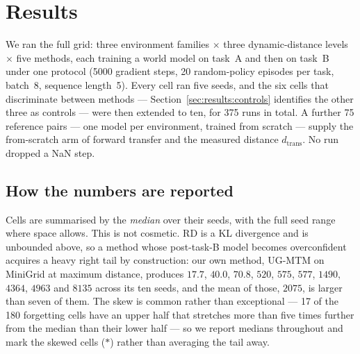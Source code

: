 %
%
%

\section{Results}
\label{sec:results}

We ran the full grid: three environment families $\times$ three dynamic-distance
levels $\times$ five methods, each training a world model on task~A and then on
task~B under one protocol (5000 gradient steps, 20 random-policy episodes per
task, batch~8, sequence length~5). Every cell ran five seeds, and the six cells
that discriminate between methods --- Section~\ref{sec:results:controls}
identifies the other three as controls --- were then extended to ten, for 375
runs in total. A further 75 reference pairs --- one model per environment,
trained from scratch --- supply the from-scratch arm of forward transfer and the
measured distance $d_{\mathrm{trans}}$. No run dropped a NaN step.

\subsection{How the numbers are reported}
\label{sec:results:reporting}

Cells are summarised by the \emph{median} over their seeds, with the full seed
range where space allows. This is not cosmetic. RD is a KL divergence and is
unbounded above, so a method whose post-task-B model becomes overconfident
acquires a heavy right tail by construction: our own method, UG-MTM on MiniGrid
at maximum distance, produces $17.7$, $40.0$, $70.8$, $520$, $575$, $577$,
$1490$, $4364$, $4963$ and $8135$ across its ten seeds, and the mean of those,
$2075$, is larger than seven of them. The skew is common rather than
exceptional --- 17 of the 180 forgetting cells have an upper half that stretches
more than five times further from the median than their lower half --- so we
report medians throughout and mark the skewed cells ($\ast$) rather than
averaging the tail away.

